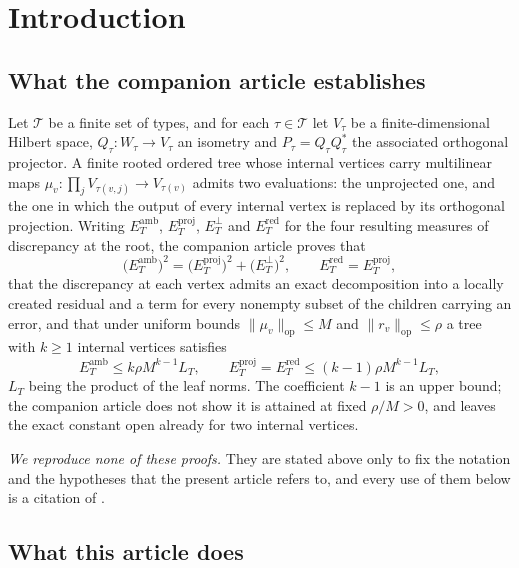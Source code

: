 \documentclass[11pt]{amsart}
\theoremstyle{definition}
\theoremstyle{remark}
\newcommand{\op}{\mathrm{op}}
\newcommand{\norm}[1]{\lVert#1\rVert}
\newcommand{\Types}{\mathcal T}
\newcommand{\proj}{\mathrm{proj}}
\newcommand{\amb}{\mathrm{amb}}
\newcommand{\red}{\mathrm{red}}
\begin{document}
\tableofcontents

\section{Introduction}
\label{sec:intro}

\subsection{What the companion article establishes}
\label{sec:finite}

Let $\Types$ be a finite set of types, and for each $\tau\in\Types$ let $V_\tau$ be a
finite-dimensional Hilbert space, $Q_\tau:W_\tau\to V_\tau$ an isometry and
$P_\tau=Q_\tau Q_\tau^{*}$ the associated orthogonal projector. A finite rooted ordered
tree whose internal vertices carry multilinear maps
$\mu_v:\prod_jV_{\tau(v,j)}\to V_{\tau(v)}$ admits two evaluations: the unprojected one,
and the one in which the output of every internal vertex is replaced by its orthogonal
projection. Writing $E_T^{\amb}$, $E_T^{\proj}$, $E_T^{\perp}$ and $E_T^{\red}$ for the
four resulting measures of discrepancy at the root, the companion article proves that
\[
 \bigl(E_T^{\amb}\bigr)^2=\bigl(E_T^{\proj}\bigr)^2+\bigl(E_T^{\perp}\bigr)^2,
 \qquad
 E_T^{\red}=E_T^{\proj},
\]
that the discrepancy at each vertex admits an exact decomposition into a locally created
residual and a term for every nonempty subset of the children carrying an error, and that
under uniform bounds $\norm{\mu_v}_\op\le M$ and $\norm{r_v}_\op\le\rho$ a tree with
$k\ge1$ internal vertices satisfies
\begin{equation}
\label{eq:companion}
 E_T^{\amb}\le k\rho M^{k-1}L_T,
 \qquad
 E_T^{\proj}=E_T^{\red}\le(k-1)\rho M^{k-1}L_T,
\end{equation}
$L_T$ being the product of the leaf norms. The coefficient $k-1$ is an upper bound; the
companion article does not show it is attained at fixed $\rho/M>0$, and leaves the exact
constant open already for two internal vertices.

\emph{We reproduce none of these proofs.} They are stated above only to fix the notation
and the hypotheses that the present article refers to, and every use of them below is a
citation of \cite{ChaveroJassoTrees}.
\label{sec:finite-end}

\subsection{What this article does}
\end{document}
